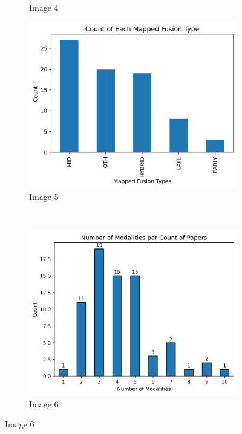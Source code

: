 \documentclass[manuscript,screen,review]{acmart}
\begin{document}
\begin{figure}[h!]
\begin{subfigure}[b]{0.45\textwidth}
        \caption{Image 4}
    \end{subfigure}
    \begin{subfigure}[b]{0.33\textwidth}
        \includegraphics[width=\textwidth]{img/statistical_imgs/fusion_type with OTH.png}
        \caption{Image 5}
    \end{subfigure}
    \\
    \begin{subfigure}[b]{0.33\textwidth}
        \includegraphics[width=\textwidth]{img/statistical_imgs/number of modalities per count of papers.png}
        \caption{Image 6}
    \end{subfigure}

\end{figure}
\end{document}

